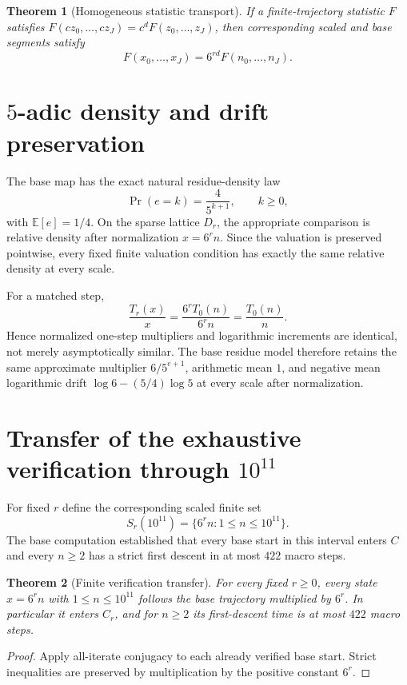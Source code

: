 \documentclass[11pt]{article}
\newtheorem{theorem}{Theorem}[section]
\theoremstyle{remark}\newtheorem{remark}[theorem]{Remark}\newtheorem{example}[theorem]{Example}
\begin{document}
\begin{theorem}[Homogeneous statistic transport]
If a finite-trajectory statistic $F$ satisfies $F(cz_0,\ldots,cz_J)=c^dF(z_0,\ldots,z_J)$, then corresponding scaled and base segments satisfy
\[
F(x_0,\ldots,x_J)=6^{rd}F(n_0,\ldots,n_J).
\]
\end{theorem}

\section{$5$-adic density and drift preservation}
The base map has the exact natural residue-density law
\[
\Pr(e=k)=\frac4{5^{k+1}},\qquad k\ge0,
\]
with $\mathbb E[e]=1/4$. On the sparse lattice $D_r$, the appropriate comparison is relative density after normalization $x=6^rn$. Since the valuation is preserved pointwise, every fixed finite valuation condition has exactly the same relative density at every scale.

For a matched step,
\[
\frac{T_r(x)}x=\frac{6^rT_0(n)}{6^rn}=\frac{T_0(n)}n.
\]
Hence normalized one-step multipliers and logarithmic increments are identical, not merely asymptotically similar. The base residue model therefore retains the same approximate multiplier $6/5^{e+1}$, arithmetic mean $1$, and negative mean logarithmic drift $\log6-(5/4)\log5$ at every scale after normalization.

\section{Transfer of the exhaustive verification through $10^{11}$}
For fixed $r$ define the corresponding scaled finite set
\[
S_r(10^{11})=\{6^rn:1\le n\le10^{11}\}.
\]
The base computation established that every base start in this interval enters $C$ and every $n\ge2$ has a strict first descent in at most $422$ macro steps.

\begin{theorem}[Finite verification transfer]\label{thm:finite}
For every fixed $r\ge0$, every state $x=6^rn$ with $1\le n\le10^{11}$ follows the base trajectory multiplied by $6^r$. In particular it enters $C_r$, and for $n\ge2$ its first-descent time is at most $422$ macro steps.
\end{theorem}
\begin{proof}Apply all-iterate conjugacy to each already verified base start. Strict inequalities are preserved by multiplication by the positive constant $6^r$.\end{proof}
\end{document}
